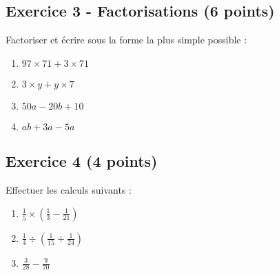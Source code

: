 \documentclass[14 pt]{extarticle}
\theoremstyle{plain}
\begin{document}
\subsection*{Exercice 3 - Factorisations (6 points)}

Factoriser et écrire sous la forme la plus simple possible : 
\begin{enumerate}
\item $97 \times 71 + 3 \times 71$ 
\item $3\times y + y \times 7$ 
\item $ 50 a - 20 b + 10$
\item $ ab + 3a -5a$
\end{enumerate}



\subsection*{Exercice 4 (4 points)}

Effectuer les calculs suivants : 

\begin{enumerate}
\item $\frac15 \times (\frac13-\frac1{21})$
\item $\frac14 \div (\frac1{15}+\frac1{24})$
\item $\frac3{28} - \frac{9}{70}$ 
\end{enumerate}


 	
\end{document}

